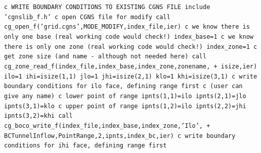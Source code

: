 \documentclass[12pt]{article}
\begin{document}
{\tt \noindent c  WRITE BOUNDARY CONDITIONS TO EXISTING CGNS FILE
\newline\indent      include 'cgnslib\_f.h'
\newline c  open CGNS file for modify
\newline\indent      call cg\_open\_f('grid.cgns',MODE\_MODIFY,index\_file,ier)
\newline c  we know there is only one base (real working code would check!)
\newline\indent      index\_base=1
\newline c  we know there is only one zone (real working code would check!)
\newline\indent      index\_zone=1
\newline c   get zone size (and name - although not needed here)
\newline\indent      call cg\_zone\_read\_f(index\_file,index\_base,index\_zone,zonename,
\newline + \indent isize,ier)
\newline\indent      ilo=1
\newline\indent      ihi=isize(1,1)
\newline\indent      jlo=1
\newline\indent      jhi=isize(2,1)
\newline\indent      klo=1
\newline\indent      khi=isize(3,1)
\newline c  write boundary conditions for ilo face, defining range first 
\newline c  (user can give any name)
\newline c  lower point of range
\newline\indent      ipnts(1,1)=ilo
\newline\indent      ipnts(2,1)=jlo
\newline\indent      ipnts(3,1)=klo
\newline c  upper point of range
\newline\indent      ipnts(1,2)=ilo
\newline\indent      ipnts(2,2)=jhi
\newline\indent      ipnts(3,2)=khi
\newline\indent      call cg\_boco\_write\_f(index\_file,index\_base,index\_zone,'Ilo',
\newline + \indent BCTunnelInflow,PointRange,2,ipnts,index\_bc,ier)
\newline c  write boundary conditions for ihi face, defining range first 
}
\end{document}
